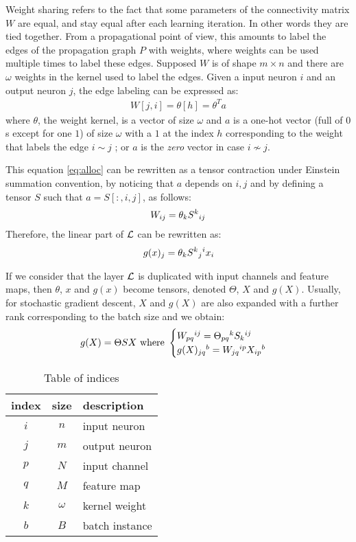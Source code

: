 Weight sharing refers to the fact that some parameters of the connectivity matrix $W$ are equal, and stay equal after each learning iteration. In other words they are tied together. From a propagational point of view, this amounts to label the edges of the propagation graph $P$ with weights, where weights can be used multiple times to label these edges. Supposed $W$ is of shape $m \times n$ and there are $\omega$ weights in the kernel used to label the edges. Given a input neuron $i$ and an output neuron $j$, the edge labeling can be expressed as:
\begin{gather}
W[j,i] = \theta[h] = \theta^T a \label{eq:alloc}
\end{gather}
where $\theta$, the weight kernel, is a vector of size $\omega$ and $a$ is a one-hot vector (full of $0$s except for one $1$) of size $\omega$ with a $1$ at the index $h$ corresponding to the weight that labels the edge $i \sim j$ ; or $a$ is the \emph{zero} vector in case $i \nsim j$.

This equation \eqref{eq:alloc} can be rewritten as a tensor contraction under Einstein summation convention, by noticing that $a$ depends on $i,j$ and by defining a tensor $S$ such that $a = S[:,i,j]$, as follows:
\begin{gather}
W_{ij} = \theta_k S^k \h{0}_{ij}
\end{gather}
Therefore, the linear part of $\cl$ can be rewritten as:
\begin{gather}
g(x)_j = \theta_k S^k \h{0}_j \h{0}^i x_i
\end{gather}

If we consider that the layer $\cl$ is duplicated with input channels and feature maps, then $\theta$, $x$ and $g(x)$ become tensors, denoted $\Theta$, $X$ and $g(X)$. Usually, for stochastic gradient descent, $X$ and $g(X)$ are also expanded with a further rank corresponding to the batch size and we obtain:
\begin{gather}
g(X) = \Theta S X
\text{ where } \begin{cases} W_{pq}\h{0}^{ij} = \Theta_{pq}\h{0}^k S_k\h{0}^{ij} \\ g(X)_{jq}\h{0}^b = W_{jq}\h{0}^{ip} X_{ip}\h{0}^{b} \end{cases} \label{eq:ternary}
\end{gather}

\begin{table}[H]
  \centering
\begin{tabular}{ccl}
  index & size & description\\
  \hline
  $i$ & $n$ & input neuron\\
  $j$ & $m$ & output neuron\\
  $p$ & $N$ & input channel\\
  $q$ & $M$ & feature map\\
  $k$ & $\omega$ & kernel weight\\
  $b$ & $B$ & batch instance
\end{tabular}
\caption{Table of indices}
\label{tab:ind}
\end{table}

